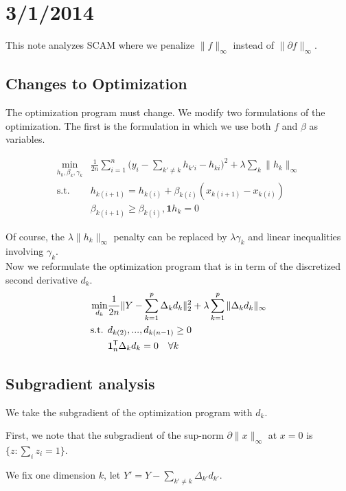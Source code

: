 \documentclass{article}
\begin{document}
\section{3/1/2014}

This note analyzes SCAM where we penalize $\| f \|_\infty$ instead of $\| \partial f \|_\infty$.

\subsection{Changes to Optimization}

The optimization program must change. We modify two formulations of the optimization. The first is the formulation in which we use both $f$ and $\beta$ as variables.

\begin{align*}
\min_{h_k, \beta_k, \gamma_k} & \frac{1}{2n} \sum_{i=1}^n
  \Big( y_i - \sum_{k' \neq k} h_{k' i} - h_{ki} \Big)^2 + \lambda \sum_k \| h_k \|_\infty \\
\textrm{s.t. } & h_{k(i+1)} = h_{k(i)} + \beta_{k(i)}(x_{k(i+1)} - x_{k(i)}) \\
  & \beta_{k(i+1)} \geq \beta_{k(i)}, \mathbf{1} h_k = 0
\end{align*}

Of course, the $\lambda \| h_k \|_\infty$ penalty can be replaced by $\lambda \gamma_k$ and linear inequalities involving $\gamma_k$.\\

Now we reformulate the optimization program that is in term of the discretized second derivative $d_k$.
\begin{align*}
\min_{d_k} &\frac{1}{2n} \| Y - \sum_{k=1}^p \Delta_k d_k \|_2^2 
    + \lambda \sum_{k=1}^p \| \Delta_k d_k \|_\infty \\
\textrm{s.t. } & d_{k(2)}, ..., d_{k(n-1)} \geq 0 \\
& \mathbf{1}_n^{\mathsf{T}} \Delta_k d_k = 0 \quad \forall k
\end{align*}

\subsection{Subgradient analysis}

We take the subgradient of the optimization program with $d_k$.

First, we note that the subgradient of the sup-norm $\partial \| x \|_\infty$ at $x=0$ is $\{ z : \sum_i z_i = 1 \}$.

We fix one dimension $k$, let $Y' = Y - \sum_{k' \neq k} \Delta_{k'} d_{k'}$.
\end{document}
